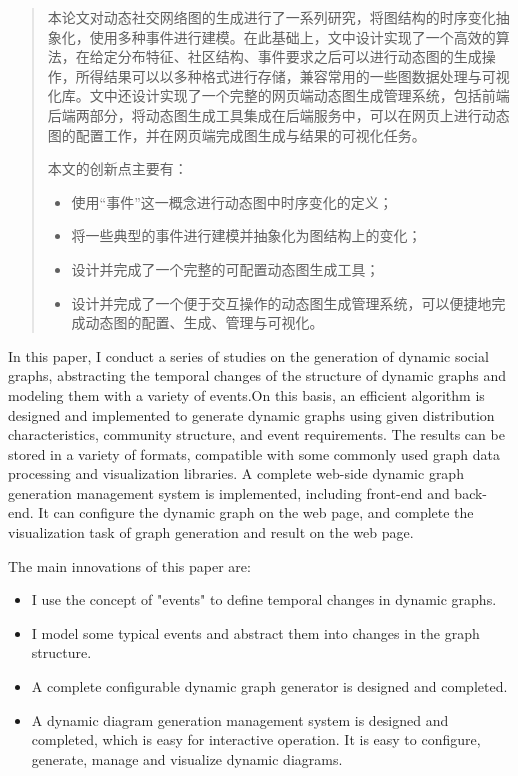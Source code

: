 

\begin{abstract}
  本论文对动态社交网络图的生成进行了一系列研究，将图结构的时序变化抽象化，使用多种事件进行建模。在此基础上，文中设计实现了一个高效的算法，在给定分布特征、社区结构、事件要求之后可以进行动态图的生成操作，所得结果可以以多种格式进行存储，兼容常用的一些图数据处理与可视化库。文中还设计实现了一个完整的网页端动态图生成管理系统，包括前端后端两部分，将动态图生成工具集成在后端服务中，可以在网页上进行动态图的配置工作，并在网页端完成图生成与结果的可视化任务。

  本文的创新点主要有：
  \begin{itemize}
    \item 使用“事件”这一概念进行动态图中时序变化的定义；
    \item 将一些典型的事件进行建模并抽象化为图结构上的变化；
    \item 设计并完成了一个完整的可配置动态图生成工具；
    \item 设计并完成了一个便于交互操作的动态图生成管理系统，可以便捷地完成动态图的配置、生成、管理与可视化。
  \end{itemize}

\end{abstract}

\begin{abstract*}
  In this paper, I conduct a series of studies on the generation of dynamic social graphs, abstracting the temporal changes of the structure of dynamic graphs and modeling them with a variety of events.On this basis, an efficient algorithm is designed and implemented to generate dynamic graphs using given distribution characteristics, community structure, and event requirements. The results can be stored in a variety of formats, compatible with some commonly used graph data processing and visualization libraries. A complete web-side dynamic graph generation management system is implemented, including front-end and back-end. It can configure the dynamic graph on the web page, and complete the visualization task of graph generation and result on the web page.

  The main innovations of this paper are:
  \begin{itemize}
    \item I use the concept of "events" to define temporal changes in dynamic graphs.
    \item I model some typical events and abstract them into changes in the graph structure.
    \item A complete configurable dynamic graph generator is designed and completed.
    \item A dynamic diagram generation management system is designed and completed, which is easy for interactive operation. It is easy to configure, generate, manage and visualize dynamic diagrams.
  \end{itemize}

\end{abstract*}
